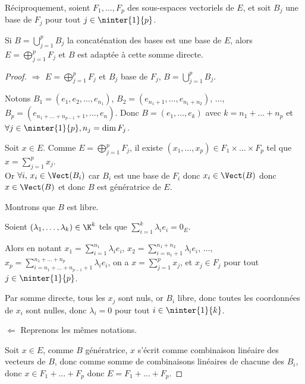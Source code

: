 \begin{theoreme}{}{}
    Réciproquement, soient $F_1, \dots, F_p$ des sous-espaces vectoriels de $E$, et soit 
    $B_j$ une base de $F_j$ pour tout $j \in \ninter{1}{p}$. 

    Si $\displaystyle B = \bigcup_{j=1}^p B_j$ la concaténation des bases est une base de $E$, alors
    $\displaystyle E = \bigoplus_{j=1}^p F_j$ et $B$ est adaptée à cette somme directe.
\end{theoreme}


\begin{proof}
    $\Rightarrow$ $E = \bigoplus_{j=1}^p F_j$ et $B_j$ base de $F_j$, $B = \bigcup_{j=1}^p B_j$. 

    Notons $B_1 = (e_1, e_2, \dots, e_{n_1})$, $B_2 = (e_{n_1 + 1}, \dots, e_{n_1 + n_2})$,
    $\dots$, $B_p = (e_{n_1 + \dots + n_{p-1} + 1}, \dots, e_n)$. Donc $B = (e_1, \dots, e_k)$ 
    avec $k = n_1 + \dots + n_p$ et $\forall j \in \ninter{1}{p}, n_j = \dim F_j$.

    Soit $x \in E$. Comme $E = \bigoplus_{j=1}^p F_j$, il existe $(x_1, \dots, x_p) \in F_1 \times \dots \times F_p$ tel que
    $x = \sum_{j=1}^p x_j$. \\
    Or $\forall i, \, x_i \in \Vect (B_i)$ car $B_i$ est une base de $F_i$ donc
    $x_i \in \Vect (B)$ donc $x \in \Vect (B)$ et donc $B$ est génératrice de $E$.

    \svspace Montrons que $B$ est libre. 

    Soient $(\lambda_1, \dots, \lambda_k) \in \K^k$ tels que
    $\displaystyle \sum_{i=1}^k \lambda_i e_i = 0_E$.

    Alors en notant $\displaystyle x_1 = \sum_{i=1}^{n_1} \lambda_i e_i$,
    $\displaystyle x_2 = \sum_{i=n_1 + 1}^{n_1 + n_2} \lambda_i e_i$,
    $\dots$, $\displaystyle x_p = \sum_{i=n_1 + \dots + n_{p-1} + 1}^{n_1 + \dots + n_p} \lambda_i e_i$,
    on a $x = \sum_{j=1}^p x_j$, et $x_j \in F_j$ pour tout $j \in \ninter{1}{p}$.

    Par somme directe, tous les $x_j$ sont nuls, or $B_i$ libre, donc toutes les coordonnées de $x_i$ sont nulles, donc
    $\lambda_i = 0$ pour tout $i \in \ninter{1}{k}$.

    \lvspace $\Leftarrow$ Reprenons les mêmes notations. 

    Soit $x \in E$, comme $B$ génératrice, $x$ s'écrit comme combinaison linéaire 
    des vecteurs de $B$, donc comme somme de combinaisons linéaires de chacune 
    des $B_i$, donc $x \in F_1 + \dots + F_p$ donc $E = F_1 + \dots + F_p$.


\end{proof}
